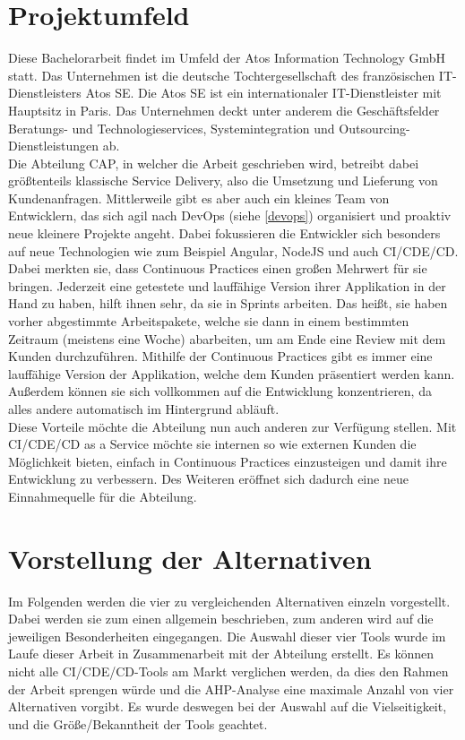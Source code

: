 \section{Projektumfeld}
Diese Bachelorarbeit findet im Umfeld der Atos Information Technology GmbH statt. Das Unternehmen ist die deutsche Tochtergesellschaft des französischen IT-Dienstleisters Atos SE. Die Atos SE ist ein internationaler IT-Dienstleister mit Hauptsitz in Paris. Das Unternehmen deckt unter anderem die Geschäftsfelder Beratungs- und Technologieservices, Systemintegration und Outsourcing-Dienstleistungen ab.\\
Die Abteilung \ac{CAP}, in welcher die Arbeit geschrieben wird, betreibt dabei größtenteils klassische Service Delivery, also die Umsetzung und Lieferung von Kundenanfragen. Mittlerweile gibt es aber auch ein kleines Team von Entwicklern, das sich agil nach DevOps (siehe \ref{devops}) organisiert und proaktiv neue kleinere Projekte angeht. Dabei fokussieren die Entwickler sich besonders auf neue Technologien wie zum Beispiel Angular, NodeJS und auch \ac{CI}/\ac{CDE}/\ac{CD}.\\ 
Dabei merkten sie, dass Continuous Practices einen großen Mehrwert für sie bringen. Jederzeit eine getestete und lauffähige Version ihrer Applikation in der Hand zu haben, hilft ihnen sehr, da sie in Sprints arbeiten. Das heißt, sie haben vorher abgestimmte Arbeitspakete, welche sie dann in einem bestimmten Zeitraum (meistens eine Woche) abarbeiten, um am Ende eine Review mit dem Kunden durchzuführen. Mithilfe der Continuous Practices gibt es immer eine lauffähige Version der Applikation, welche dem Kunden präsentiert werden kann. Außerdem können sie sich vollkommen auf die Entwicklung konzentrieren, da alles andere automatisch im Hintergrund abläuft.\\ 
Diese Vorteile möchte die Abteilung nun auch anderen zur Verfügung stellen. Mit \ac{CI}/\ac{CDE}/\ac{CD} as a Service möchte sie internen so wie externen Kunden die Möglichkeit bieten, einfach in Continuous Practices einzusteigen und damit ihre Entwicklung zu verbessern. Des Weiteren eröffnet sich dadurch eine neue Einnahmequelle für die Abteilung.
\section{Vorstellung der Alternativen}
Im Folgenden werden die vier zu vergleichenden Alternativen einzeln vorgestellt. Dabei werden sie zum einen allgemein beschrieben, zum anderen wird auf die jeweiligen Besonderheiten eingegangen. Die Auswahl dieser vier Tools wurde im Laufe dieser Arbeit in Zusammenarbeit mit der Abteilung erstellt. Es können nicht alle \ac{CI}/\ac{CDE}/\ac{CD}-Tools am Markt verglichen werden, da dies den Rahmen der Arbeit sprengen würde und die AHP-Analyse eine maximale Anzahl von vier Alternativen vorgibt. Es wurde deswegen bei der Auswahl auf die Vielseitigkeit, und die Größe/Bekanntheit der Tools geachtet.
